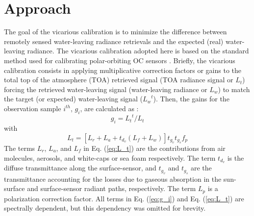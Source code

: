 \documentclass[10pt]{article}
\begin{document}
\section{Approach}
The goal of the vicarious calibration is to minimize the difference between remotely sensed water-leaving radiance retrievals and the expected (real) water-leaving radiance. The vicarious calibration adopted here is based on the standard method used for calibrating polar-orbiting OC sensors \cite{Franz:07}. Briefly, the vicarious calibration consists in applying multiplicative correction factors or gains to the total top of the atmosphere (TOA) retrieved signal (TOA radiance signal or $L_t$) forcing the retrieved water-leaving signal (water-leaving radiance or $L_w$) to match the target (or expected) water-leaving signal (${L_w}^t$). Then, the gains for the observation sample $i^{th}$, $g_i$, are calculated as \cite{Franz:07}:
\begin{equation}\label{eq:g_i}
  g_i={L_t}^t/L_t
\end{equation}
with
\begin{equation}\label{eq:L_t}
  L_t=[L_r+L_a+t_{d_v}(L_f+L_w)]t_{g_v}t_{g_s}f_p
\end{equation}
The terms $L_r$, $L_a$, and $L_f$ in Eq. (\ref{eq:L_t}) are the contributions from air molecules, aerosols, and white-caps or sea foam respectively. The term $t_{d_v}$ is the diffuse transmittance along the surface-sensor, and $t_{g_v}$ and $t_{g_s}$  are the transmittance accounting for the losses due to gaseous absorption in the sun-surface and surface-sensor radiant paths, respectively. The term $L_p$ is a polarization correction factor. All terms in Eq. (\ref{eq:g_i}) and Eq. (\ref{eq:L_t}) are spectrally dependent, but this dependency was omitted for brevity.
\end{document}
